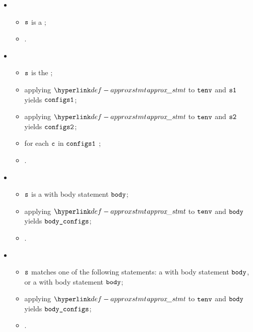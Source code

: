\begin{itemize}
  \item {}
  \begin{itemize}
    \item $\texttt{s}$ is a \throwstatementsterm;
    \item  {}.
  \end{itemize}

  \item {}
  \begin{itemize}
    \item $\texttt{s}$ is the \sequencingstatement{$\vsone$}{$\vstwo$};
    \item applying $\approxstmt$ to $\texttt{tenv}$ and $\vsone$ yields $\texttt{configs1}$;
    \item applying $\approxstmt$ to $\texttt{tenv}$ and $\vstwo$ yields $\texttt{configs2}$;
    \item for each \Proseabstractconfiguration{} $\texttt{c}$ in $\texttt{configs1}$ ;
    \item {}.
  \end{itemize}

  \item {}
  \begin{itemize}
    \item $\texttt{s}$ is a \repeatstatementsterm{} with body statement $\texttt{body}$;
    \item applying $\approxstmt$ to $\texttt{tenv}$ and $\texttt{body}$ yields $\texttt{body\_configs}$;
    \item {}.
  \end{itemize}

  \item {}
  \begin{itemize}
    \item $\texttt{s}$ matches one of the following statements:
          a \forstatementterm{} with body statement $\texttt{body}$, or a \whilestatementterm{} with body statement $\texttt{body}$;
    \item applying $\approxstmt$ to $\texttt{tenv}$ and $\texttt{body}$ yields $\texttt{body\_configs}$;
    \item {}.
  \end{itemize}


\end{itemize}
